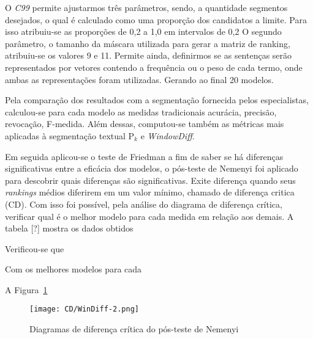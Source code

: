 O \textit{C99} permite ajustarmos três parâmetros, sendo, a quantidade segmentos desejados, o qual é calculado como uma proporção dos candidatos a limite. Para isso atribuiu-se as proporções de 0,2 a 1,0 em intervalos de 0,2 O segundo parâmetro, o tamanho da máscara utilizada para gerar a matriz de ranking, atribuiu-se os valores 9 e 11. Permite ainda, definirmos se as sentenças serão representados por vetores contendo a frequência ou o peso de cada termo, onde ambas as representações foram utilizadas. Gerando ao final 20 modelos.



Pela comparação dos resultados com a segmentação fornecida pelos especialistas, calculou-se para cada modelo as medidas tradicionais acurácia, precisão, revocação, F-medida. Além dessas, computou-se também as métricas mais aplicadas à segmentação textual P$_k$ e \textit{WindowDiff}.



Em seguida aplicou-se o teste de Friedman a fim de saber se há diferenças significativas entre a eficácia dos modelos, o pós-teste de Nemenyi foi aplicado para descobrir quais diferenças são significativas. 
%
Exite diferença quando seus \textit{rankings} médios diferirem em um valor mínimo, chamado de diferença critica (CD). 
%
Com isso foi possível, pela análise do diagrama de diferença crítica, verificar qual é o melhor modelo para cada medida
em relação aos demais. A tabela [?] mostra os dados obtidos



Verificou-se que 



Com os melhores modelos para cada



A Figura~\ref{fig:cd} 


\newcommand{\cdsize}{0.6\textwidth}

\begin{figure}[!h]
	\centering
	\texttt{[image: CD/WinDiff-2.png]}
	\caption{Diagramas de diferença crítica do pós-teste de Nemenyi}
	\label{fig:cd}
\end{figure}





